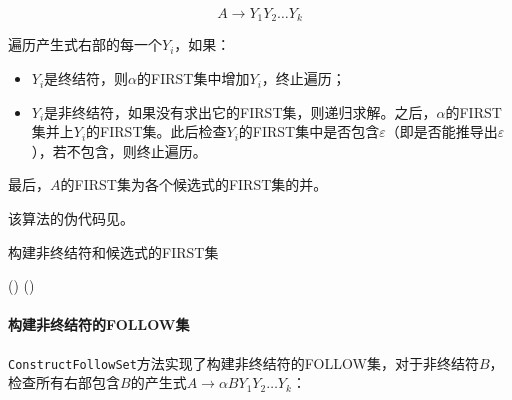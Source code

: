 \documentclass[lang=cn,11pt,a4paper,cite=authornum]{paper}
\begin{document}
$$
A\rightarrow Y_1Y_2\ldots Y_k
$$

遍历产生式右部的每一个$Y_i$，如果：

\begin{itemize}
    \item $Y_i$是终结符，则$\alpha$的FIRST集中增加$Y_i$，终止遍历；
    \item $Y_i$是非终结符，如果没有求出它的FIRST集，则递归求解。之后，$\alpha$的FIRST集并上$Y_i$的FIRST集。此后检查$Y_i$的FIRST集中是否包含$\varepsilon$（即是否能推导出$\varepsilon$），若不包含，则终止遍历。
\end{itemize}

最后，$A$的FIRST集为各个候选式的FIRST集的并。

该算法的伪代码见。

\begin{algorithm}[!htb]
    \caption{构建非终结符和候选式的FIRST集\label{algo:cons_first}}
    \Fn(){}{
    }
    \Fn(){\ConsFirstSet{}}{
    }
\end{algorithm}

\paragraph{构建非终结符的FOLLOW集} \texttt{ConstructFollowSet}方法实现了构建非终结符的FOLLOW集，对于非终结符$B$，检查所有右部包含$B$的产生式$A\rightarrow\alpha BY_1Y_2\ldots Y_k$：
\end{document}
